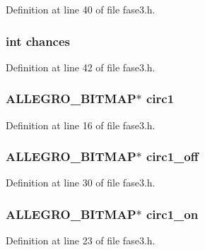 Definition at line 40 of file fase3.\-h.

\hypertarget{struct_level_tres_a654217f8a02c11b0a494d8db3c912d7a}{
\subsubsection[{chances}]{\setlength{\rightskip}{0pt plus 5cm}int chances}}\label{struct_level_tres_a654217f8a02c11b0a494d8db3c912d7a}


Definition at line 42 of file fase3.\-h.

\hypertarget{struct_level_tres_a9877f31790b6d2f38fb468a9448223f1}{
\subsubsection[{circ1}]{\setlength{\rightskip}{0pt plus 5cm}A\-L\-L\-E\-G\-R\-O\-\_\-\-B\-I\-T\-M\-A\-P$\ast$ circ1}}\label{struct_level_tres_a9877f31790b6d2f38fb468a9448223f1}


Definition at line 16 of file fase3.\-h.

\hypertarget{struct_level_tres_a61973bafd11ab9dea9306731297f4728}{
\subsubsection[{circ1\-\_\-off}]{\setlength{\rightskip}{0pt plus 5cm}A\-L\-L\-E\-G\-R\-O\-\_\-\-B\-I\-T\-M\-A\-P$\ast$ circ1\-\_\-off}}\label{struct_level_tres_a61973bafd11ab9dea9306731297f4728}


Definition at line 30 of file fase3.\-h.

\hypertarget{struct_level_tres_a15699608afb18fad793848cd8fd32fe0}{
\subsubsection[{circ1\-\_\-on}]{\setlength{\rightskip}{0pt plus 5cm}A\-L\-L\-E\-G\-R\-O\-\_\-\-B\-I\-T\-M\-A\-P$\ast$ circ1\-\_\-on}}\label{struct_level_tres_a15699608afb18fad793848cd8fd32fe0}


Definition at line 23 of file fase3.\-h.

